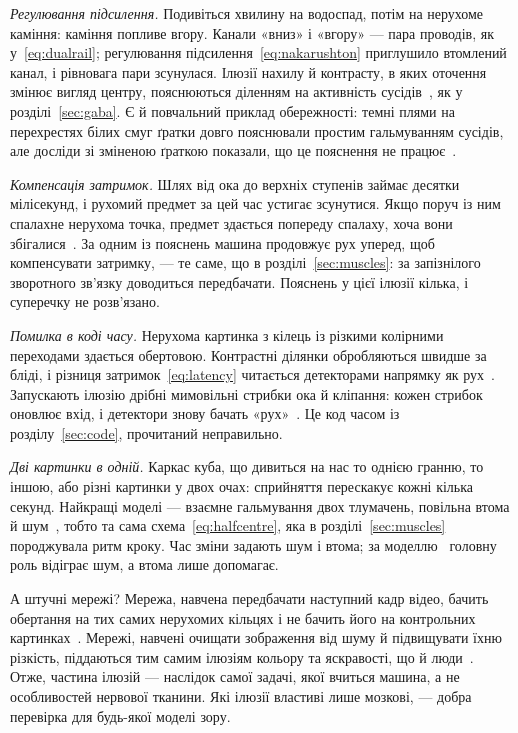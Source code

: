 \emph{Регулювання підсилення.} Подивіться хвилину на водоспад, потім на нерухоме каміння: каміння попливе вгору. Канали «вниз» і «вгору» --- пара проводів, як у~\eqref{eq:dualrail}; регулювання підсилення~\eqref{eq:nakarushton} приглушило втомлений канал, і рівновага пари зсунулася. Ілюзії нахилу й контрасту, в яких оточення змінює вигляд центру, пояснюються діленням на активність сусідів~\cite{Schwartz2009}, як у розділі~\ref{sec:gaba}. Є й повчальний приклад обережності: темні плями на перехрестях білих смуг ґратки довго пояснювали простим гальмуванням сусідів, але досліди зі зміненою ґраткою показали, що це пояснення не працює~\cite{SchillerCarvey2005}.

\emph{Компенсація затримок.} Шлях від ока до верхніх ступенів займає десятки мілісекунд, і рухомий предмет за цей час устигає зсунутися. Якщо поруч із ним спалахне нерухома точка, предмет здається попереду спалаху, хоча вони збігалися~\cite{Nijhawan1994}. За одним із пояснень машина продовжує рух уперед, щоб компенсувати затримку, --- те саме, що в розділі~\ref{sec:muscles}: за запізнілого зворотного зв'язку доводиться передбачати. Пояснень у цієї ілюзії кілька, і суперечку не розв'язано.

\emph{Помилка в коді часу.} Нерухома картинка з кілець із різкими колірними переходами здається обертовою. Контрастні ділянки обробляються швидше за бліді, і різниця затримок~\eqref{eq:latency} читається детекторами напрямку як рух~\cite{Conway2005}. Запускають ілюзію дрібні мимовільні стрибки ока й кліпання: кожен стрибок оновлює вхід, і детектори знову бачать «рух»~\cite{OteroMillan2012}. Це код часом із розділу~\ref{sec:code}, прочитаний неправильно.

\emph{Дві картинки в одній.} Каркас куба, що дивиться на нас то однією гранню, то іншою, або різні картинки у двох очах: сприйняття перескакує кожні кілька секунд. Найкращі моделі --- взаємне гальмування двох тлумачень, повільна втома й шум~\cite{MorenoBote2007}, тобто та сама схема~\eqref{eq:halfcentre}, яка в розділі~\ref{sec:muscles} породжувала ритм кроку. Час зміни задають шум і втома; за моделлю~\cite{MorenoBote2007} головну роль відіграє шум, а втома лише допомагає.

А штучні мережі? Мережа, навчена передбачати наступний кадр відео, бачить обертання на тих самих нерухомих кільцях і не бачить його на контрольних картинках~\cite{Watanabe2018}. Мережі, навчені очищати зображення від шуму й підвищувати їхню різкість, піддаються тим самим ілюзіям кольору та яскравості, що й люди~\cite{GomezVilla2020}. Отже, частина ілюзій --- наслідок самої задачі, якої вчиться машина, а не особливостей нервової тканини. Які ілюзії властиві лише мозкові, --- добра перевірка для будь-якої моделі зору.

